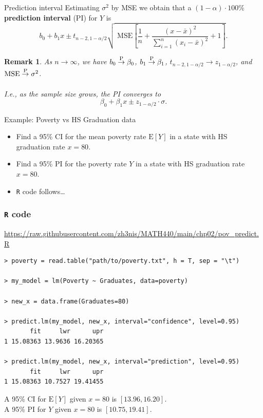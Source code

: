 \documentclass{beamer}
\newcommand{\E}{\mathrm{E}}
\newtheorem{remark}{Remark}
\begin{document}
\begin{frame}{Prediction interval}
Estimating $\sigma^2$ by MSE we obtain that a $(1-\alpha)\cdot100\%$ \textbf{prediction interval} (PI) for $Y$ is
$$
b_0+b_1 x\pm t_{n-2,1-\alpha/2}\sqrt{{\text{ MSE}}\left[\frac1n+\frac{(x-\bar{x})^2}{\sum_{i=1}^n(x_i-\bar{x})^2}+1\right]}.
$$
\begin{remark} As $n\to\infty$, we have $b_0\stackrel{\rm P}{\to}\beta_0$, $b_1\stackrel{\rm P}{\to}\beta_1$, $t_{n-2,1-\alpha/2}\to z_{1-\alpha/2}$, and ${\rm MSE}\stackrel{\mathrm{P}}{\to}\sigma^2$.\\~\\

I.e., as the sample size grows, the PI converges to
$$
\beta_0+\beta_1 x\pm z_{1-\alpha/2}\cdot\sigma.
$$
\end{remark}
\end{frame}

\begin{frame}{Example: Poverty vs HS Graduation data}
\begin{itemize}
\item Find a 95\% CI for the mean poverty rate $\E[Y]$ in a state with HS graduation rate $x=80$.
\item Find a 95\% PI for the poverty rate $Y$ in a state with HS graduation rate $x=80$.
\item \texttt{R} code follows\ldots
\end{itemize}
\end{frame}

\begin{frame}[fragile]
\frametitle{\texttt{R} code}
{\color{blue}\url{https://raw.githubusercontent.com/zh3nis/MATH440/main/chp02/pov_predict.R}}
\begin{footnotesize}
\begin{verbatim}
> poverty = read.table("path/to/poverty.txt", h = T, sep = "\t")

> my_model = lm(Poverty ~ Graduates, data=poverty)

> new_x = data.frame(Graduates=80)

> predict.lm(my_model, new_x, interval="confidence", level=0.95)
       fit     lwr      upr
1 15.08363 13.9636 16.20365

> predict.lm(my_model, new_x, interval="prediction", level=0.95)
       fit     lwr      upr
1 15.08363 10.7527 19.41455
\end{verbatim}
\end{footnotesize}

\pause A 95\% CI for $\E[Y]$ given $x=80$ is $[13.96, 16.20]$.\\
\pause A 95\% PI for $Y$ given $x=80$ is $[10.75, 19.41]$.
\end{frame}
\end{document}
